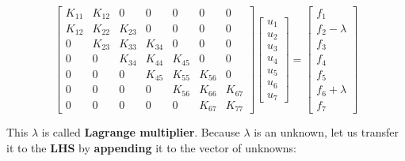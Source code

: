 \begin{equation}\label{nb-ch3-master-stiffness-6-bar-lagrange}
    \begin{bmatrix}
        K_{11} & K_{12} & 0 & 0 & 0 & 0 & 0 \\
        K_{12} & K_{22} & K_{23} & 0 & 0 & 0 & 0 \\
        0 & K_{23} & K_{33} & K_{34} & 0 & 0 & 0 \\
        0 & 0 & K_{34} & K_{44} & K_{45} & 0 & 0 \\
        0 & 0 & 0 & K_{45} & K_{55} & K_{56} & 0 \\
        0 & 0 & 0 & 0 & K_{56} & K_{66} & K_{67} \\
        0 & 0 & 0 & 0 & 0 & K_{67} & K_{77}
    \end{bmatrix}
    \begin{bmatrix}
        u_1 \\
        u_2 \\
        u_3 \\
        u_4 \\
        u_5 \\
        u_6 \\
        u_7
    \end{bmatrix}
    = \begin{bmatrix}
        f_1 \\
        f_2 - \lambda \\
        f_3 \\
        f_4 \\
        f_5 \\
        f_6 + \lambda \\
        f_7
    \end{bmatrix}
\end{equation}

This $ \lambda $ is called \textbf{Lagrange multiplier}. Because $ \lambda $
is an unknown, let us transfer it to the \textbf{LHS} by \textbf{appending} it
to the vector of unknowns:

